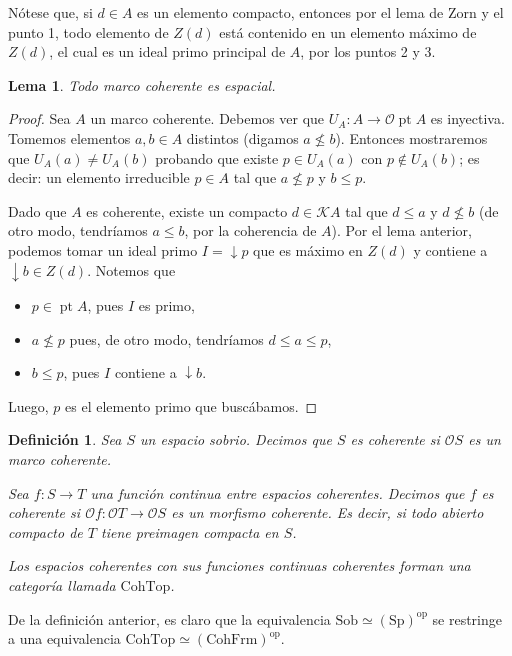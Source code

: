 \documentclass[12pt,letterpaper,titlepage]{article}
\newtheorem*{defn}{Definición}
\newtheorem{lemma}{Lema}
\theoremstyle{definition}
\newcommand\down{{\downarrow}}
\renewcommand\cal[1]{\mathcal{#1}}
\newcommand\<{\langle}
\renewcommand\>{\rangle}
\newcommand{\Sp}{\mathrm{Sp}}
\newcommand{\Sob}{\mathrm{Sob}}
\newcommand{\CohFrm}{\mathrm{CohFrm}}
\newcommand{\CohTop}{\mathrm{CohTop}}
\newcommand{\op}{\mathrm{op}}
\DeclareMathOperator{\pt}{pt}
\begin{document}
Nótese que, si $d\in A$ es un elemento compacto,
entonces por el lema de Zorn y el punto 1,
todo elemento de $Z(d)$ está contenido en un elemento máximo de
$Z(d)$, el cual es un ideal primo principal de $A$,
por los puntos 2 y 3.


\begin{lemma}
    Todo marco coherente es espacial.
\end{lemma}
\begin{proof}
    Sea $A$ un marco coherente.
    Debemos ver que $U_A:A\to\cal O\pt A$ es inyectiva.
    Tomemos elementos $a,b\in A$ distintos (digamos $a\nleq b$).
    Entonces mostraremos que $U_A(a)\neq U_A(b)$
    probando que existe $p\in U_A(a)$ con $p\nin U_A(b)$;
    es decir: un elemento irreducible $p\in A$
    tal que $a\nleq p$ y $b\leq p$.
    
    Dado que $A$ es coherente, existe un compacto $d\in\cal KA$
    tal que $d\leq a$ y $d\nleq b$
    (de otro modo, tendríamos $a\leq b$, por la coherencia de $A$).
    Por el lema anterior, podemos tomar un ideal primo
    $I=\down p$ que es máximo en $Z(d)$
    y contiene a $\down b\in Z(d)$.
    Notemos que
    \begin{itemize}
        \item $p\in\pt A$, pues $I$ es primo,
        \item $a\nleq p$ pues, de otro modo,
        tendríamos $d\leq a\leq p$,
        \item $b\leq p$, pues $I$ contiene a $\down b$.
    \end{itemize}
    Luego, $p$ es el elemento primo que buscábamos.
\end{proof}

\begin{defn}
    Sea $S$ un espacio sobrio.
    Decimos que $S$ es coherente
    si $\cal OS$ es un marco coherente.
    
    Sea $f:S\to T$ una función continua entre espacios coherentes.
    Decimos que $f$ es coherente si $\cal Of:\cal OT\to\cal OS$
    es un morfismo coherente.
    Es decir, si todo abierto compacto de $T$ tiene preimagen
    compacta en $S$.
    
    Los espacios coherentes con sus funciones continuas
    coherentes forman una categoría llamada $\CohTop$.
\end{defn}

De la definición anterior,
es claro que la equivalencia $\Sob\simeq(\Sp)^\op$
se restringe a una equivalencia $\CohTop\simeq(\CohFrm)^\op$.
\end{document}
